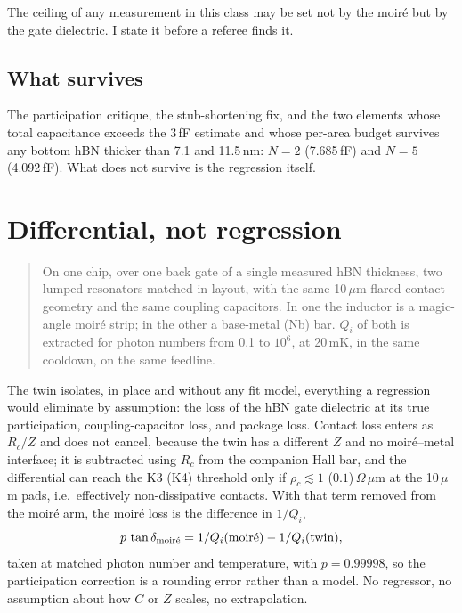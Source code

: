 \documentclass[aps,prb,reprint,superscriptaddress,longbibliography]{revtex4-2}
\begin{document}
The ceiling of any measurement in this class may be set not by the
moir\'e but by the gate dielectric. I state it before a referee finds it.

\subsection{What survives}

The participation critique, the stub-shortening fix, and the two
elements whose total capacitance exceeds the 3\,fF estimate and whose
per-area budget survives any bottom hBN thicker than 7.1 and 11.5\,nm:
$N = 2$ (7.685\,fF) and $N = 5$ (4.092\,fF). What does not survive is the
regression itself.

\section{Differential, not regression}
\label{sec:diff}

\begin{quote}
On one chip, over one back gate of a single measured hBN thickness, two
lumped resonators matched in layout, with the same 10\,$\mu$m flared
contact geometry and the same coupling capacitors. In one the
inductor is a magic-angle moir\'e strip; in the other a base-metal (Nb)
bar. $Q_i$ of both is extracted for photon numbers from 0.1 to $10^{6}$,
at 20\,mK, in the same cooldown, on the same feedline.
\end{quote}

The twin isolates, in place and without any fit model, everything a
regression would eliminate by assumption: the loss of the hBN gate
dielectric at its true participation, coupling-capacitor loss, and
package loss. Contact loss enters as $R_c/Z$ and does not cancel,
because the twin has a different $Z$ and no moir\'e--metal interface;
it is subtracted using $R_c$ from the companion Hall bar, and the
differential can reach the K3 (K4) threshold only if $\rho_c \lesssim 1$
($0.1$)\,$\Omega\,\mu$m at the 10\,$\mu$m pads, i.e.\ effectively
non-dissipative contacts. With that term removed from the moir\'e arm,
the moir\'e loss is the difference in $1/Q_i$,
\begin{equation}
p\,\tan\delta_{\rm moir\acute{e}} = 1/Q_i({\rm moir\acute{e}}) -
1/Q_i({\rm twin}),
\label{eq:diff}
\end{equation}
taken at matched photon number and temperature, with $p = 0.99998$, so
the participation correction is a rounding error rather than a model. No
regressor, no assumption about how $C$ or $Z$ scales, no extrapolation.
\end{document}
